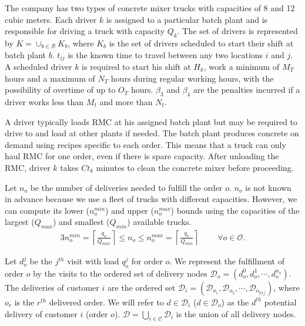 \documentclass{article}
\begin{document}
The company has two types of concrete mixer trucks with capacities of 8 and 12 cubic meters. Each driver $k$ is assigned to a particular batch plant and is responsible for driving a truck with capacity $Q_k$. The set of drivers is represented by $K =\cup_{b \in \mathcal{B}}K_b $, where $K_b$ is the set of drivers scheduled to start their shift at batch plant $b$. $t_{ij}$ is the known time to travel between any two locations $i$ and $j$.
A scheduled driver $k$ is required to start his shift at $H_k$, work a minimum of $M_T$ hours and a maximum of $N_T$ hours during regular working hours, with the possibility of overtime of up to $O_T$ hours. $\beta_3$ and $\beta_4$ are the penalties incurred if a driver works less than $M_t$ and more than $N_t$.

A driver typically loads RMC at his assigned batch plant but may be required to drive to and load at other plants if needed. The batch plant produces concrete on demand using recipes specific to each order. This means that a truck can only haul RMC for one order, even if there is spare capacity.  After unloading the RMC,  driver $k$ takes $Ct_k$ minutes to clean the concrete mixer before proceeding. %

Let $n_o$ be the number of deliveries needed to fulfill the order $o$. $n_o$ is not known in advance because we use a fleet of trucks with different capacities. However, we can compute its lower ($n_o^{min}$) and upper ($n_o^{max}$) bounds using the capacities of the largest ($Q_{max}$) and smallest ($Q_{min}$) available trucks. 
\begin{alignat}{3}
    \label{mod:c0}
       n_o^{min} = \left\lceil \frac{q_o}{Q_{max}} \right\rceil \leq n_o \leq n_o^{max} = \left\lceil \frac{q_o}{Q_{min}} \right\rceil  & \text{ } & 
 \forall  o \in \mathcal{O}.
\end{alignat}

Let $d^j_{o}$ be the $j^{th}$ visit with load $q^j_{o}$ for order $o$. We represent the fulfillment of order $o$ by the visits to the ordered set of delivery nodes $\mathcal{D}_o= \left(d^0_{o},d^1_{o},\cdots, d^{n_o}_{o}\right)$. The deliveries of customer $i$ are the ordered set $\mathcal{D}_i= (\mathcal{D}_{o_1}, \mathcal{D}_{o_2},\cdots,\mathcal{D}_{o_{|O_i|}})$, where $o_r$ is the $r^{th}$ delivered order. We will refer to $d \in \mathcal{D}_i$ ($d \in \mathcal{D}_o$) as the $d^{th}$ potential delivery of customer $i$ (order $o$). $\mathcal{D}=\bigcup_{i\in \mathcal{C}} \mathcal{D}_i$ is the union of all delivery nodes.
\end{document}
